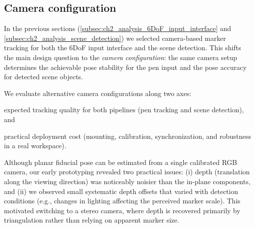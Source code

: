 \emph{} 



\DIFaddend \subsection{Camera configuration} \label{subsec:ch2_analysis_camera_tradeoffs}

In the previous sections (\autoref{subsec:ch2_analysis_6DoF_input_interface} and \autoref{subsec:ch2_analysis_scene_detection}) we selected camera-based marker tracking for both the 6DoF input interface and the scene detection. This shifts the main design question to the \emph{camera configuration}: the same camera setup determines the achievable pose stability for the pen input and the pose accuracy for detected scene objects.

We evaluate alternative camera configurations along two axes:
\begin{enumerate*}[label=(\roman*)]
  \item expected tracking quality for both pipelines (pen tracking and scene detection), and
  \item practical deployment cost (mounting, calibration, synchronization, and robustness in a real workspace).
\end{enumerate*}

Although planar fiducial pose can be estimated from a single calibrated RGB camera, our early prototyping revealed two practical issues: (i) depth (translation along the viewing direction) was noticeably noisier than the in-plane components, and (ii) we observed small systematic depth offsets that varied with detection conditions (e.g., changes in lighting affecting the perceived marker scale). This motivated switching to a stereo camera, where depth is recovered primarily by triangulation rather than relying on apparent marker size.


